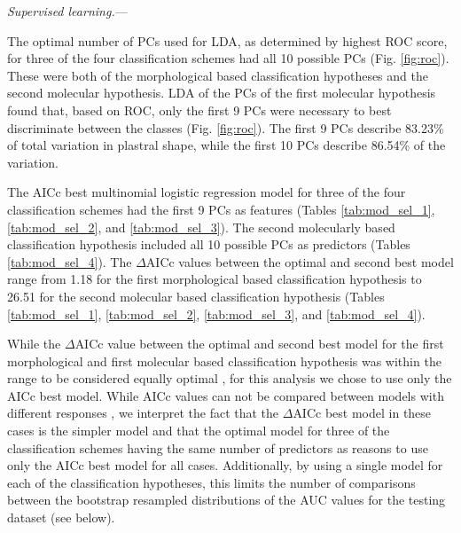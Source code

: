 \documentclass[12pt,letterpaper]{article}\usepackage{graphicx, color}
\renewcommand{\subsubsection}[1]{%
\vspace{2ex}
\noindent
\textit{#1.}---}
\begin{document}

\subsubsection{Supervised learning}


The optimal number of PCs used for LDA, as determined by highest ROC score, for three of the four classification schemes had all 10 possible PCs (Fig. \ref{fig:roc}). These were both of the morphological based classification hypotheses and the second molecular hypothesis. LDA of the PCs of the first molecular hypothesis found that, based on ROC, only the first 9 PCs were necessary to best discriminate between the classes (Fig. \ref{fig:roc}). The first 9 PCs describe 83.23\% of total variation in plastral shape, while the first 10 PCs describe 86.54\% of the variation.




The AICc best multinomial logistic regression model for three of the four classification schemes had the first 9 PCs as features (Tables \ref{tab:mod_sel_1}, \ref{tab:mod_sel_2}, and \ref{tab:mod_sel_3}). The second molecularly based classification hypothesis included all 10 possible PCs as predictors (Tables \ref{tab:mod_sel_4}).
The \(\Delta\)AICc values between the optimal and second best model range from 1.18 for the first morphological based classification hypothesis to 26.51 for the second molecular based classification hypothesis (Tables \ref{tab:mod_sel_1}, \ref{tab:mod_sel_2}, \ref{tab:mod_sel_3}, and \ref{tab:mod_sel_4}).

While the \(\Delta\)AICc value between the optimal and second best model for the first morphological and first molecular based classification hypothesis was within the range to be considered equally optimal \citep{Burnham2002a}, for this analysis we chose to use only the AICc best model. While AICc values can not be compared between models with different responses \citep{Burnham2002a}, we interpret the fact that the \(\Delta\)AICc best model in these cases is the simpler model and that the optimal model for three of the classification schemes having the same number of predictors as reasons to use only the AICc best model for all cases. 
Additionally, by using a single model for each of the classification hypotheses, this limits the number of comparisons between the bootstrap resampled distributions of the AUC values for the testing dataset (see below).
\end{document}
